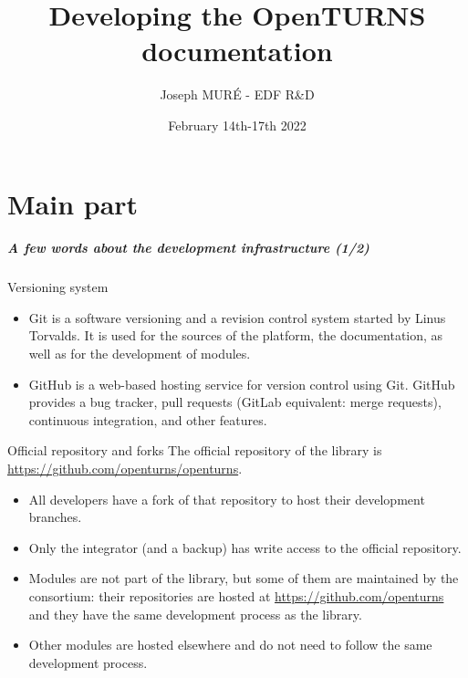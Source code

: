 \documentclass[8pt]{beamer}
\title{Developing the OpenTURNS documentation}
\author{Joseph MUR\'E - EDF R\&D}
\date{February 14th-17th 2022}
\institute{\small OpenTURNS Consortium}
\begin{document}
\frame{\titlepage}

\part{Main part}


\begin{frame}
  \frametitle{A few words about the development infrastructure (1/2)}
  \begin{block}{Versioning system}
    \begin{itemize}
    \item \alert{Git} is a software versioning and a revision control system started by Linus Torvalds. It is used for the sources of the platform, the documentation, as well as for the development of modules.
    \item \alert{GitHub} is a web-based hosting service for version control using Git.
    GitHub provides a bug tracker, pull requests (GitLab equivalent: merge requests), continuous integration, and other features.
    \end{itemize}
  \end{block}
  \begin{block}{Official repository and forks}
    The \alert{official repository} of the library is \url{https://github.com/openturns/openturns}.
    \begin{itemize}
    \item All developers have a \alert{fork} of that repository to host their development branches.
    \item Only the \alert{integrator} (and a backup) has write access to the official repository.
    \item Modules are not part of the library, but some of them are maintained by the consortium: their repositories are hosted at \url{https://github.com/openturns}
    and they have the same development process as the library.
    \item Other modules are hosted elsewhere and do not need to follow the same development process.
    \end{itemize}
  \end{block}
\end{frame}
\end{document}
